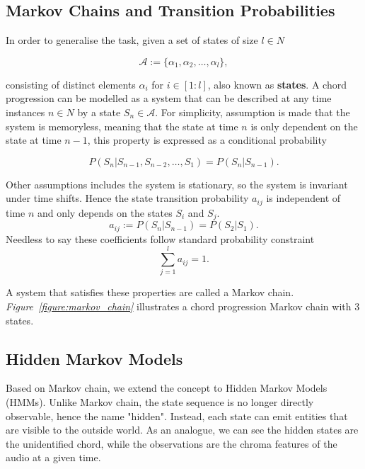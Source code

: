 \documentclass[a4paper, 9pt, twocolumn]{extarticle}
\begin{document}
\subsection{Markov Chains and Transition Probabilities}
\label{subsection:Markov_chain}
In order to generalise the task, given a set of states of size $l \in N$

\begin{equation}
    \mathcal{A} := \{\alpha_1, \alpha_2, \ldots, \alpha_l\},
\end{equation}

consisting of distinct elements $\alpha_i$ for $i \in [1:l]$, also known as \textbf{states}.
A chord progression can be modelled as a system that can be described at any time instances $n \in N$ by a state $S_n \in \mathcal{A}$.
For simplicity, assumption is made that the system is memoryless, meaning that the state at time $n$ is only dependent on the state at time $n-1$, this property is expressed as a conditional probability

\begin{equation}
    P(S_n | S_{n-1}, S_{n-2}, \ldots, S_1) = P(S_n | S_{n-1}).
\end{equation}

Other assumptions includes the system is stationary, so the system is invariant under time shifts. Hence the state transition probability $a_{ij}$ is independent of time $n$ and only depends on the states $S_i$ and $S_j$. 
\begin{equation}
    a_{ij} := P(S_n | S_{n-1}) = P(S_2 | S_1).
\end{equation}
Needless to say these coefficients follow standard probability constraint
\begin{equation}
    \sum_{j=1}^{l} a_{ij} = 1.
\end{equation}

A system that satisfies these properties are called a Markov chain. \emph{Figure~\ref{figure:markov_chain}} illustrates a chord progression Markov chain with 3 states.


\subsection{Hidden Markov Models}
\label{subsection:HMM}
Based on Markov chain, we extend the concept to Hidden Markov Models (HMMs). Unlike Markov chain, the state sequence is no longer directly observable, hence the name "hidden". Instead, each state can emit entities that are visible to the outside world. As an analogue, we can see the hidden states are the unidentified chord, while the observations are the chroma features of the audio at a given time.
\end{document}
